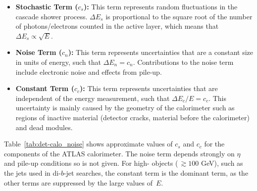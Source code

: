 \begin{itemize}[leftmargin=*]
\item\textbf{Stochastic Term ($c_s$):}
  This term represents random fluctuations in the cascade shower process.
  $\Delta E_s$ is proportional to the square root of the number of photons/electrons counted in the active layer,
  which means that $\Delta E_s \propto \sqrt{E}$. \vspace{0.5em}
\item\textbf{Noise Term ($c_n$):}
  This term represents uncertainties that are a constant size in units of energy, such that $\Delta E_n = c_n$.
  Contributions to the noise term include electronic noise and effects from pile-up. \vspace{0.5em} %
\item\textbf{Constant Term ($c_c$):}
  This term represents uncertainties that are independent of the energy measurement, such that $\Delta E_c/E = c_c$.
  This uncertainty is mainly caused by the geometry of the calorimeter such as regions of inactive material (detector cracks, material before the calorimeter) and dead modules.
\end{itemize}

Table~\ref{tab:det-calo_noise} shows approximate values of $c_s$ and $c_c$ for the components of the ATLAS calorimeter.
The noise term depends strongly on $\eta$ and pile-up conditions so is not given.
For high-\pT{} objects ($\,\gtrsim 100$ GeV), such as the jets used in di-$b$-jet searches, the constant term is the dominant term,
as the other terms are suppressed by the large values of~$E$.

